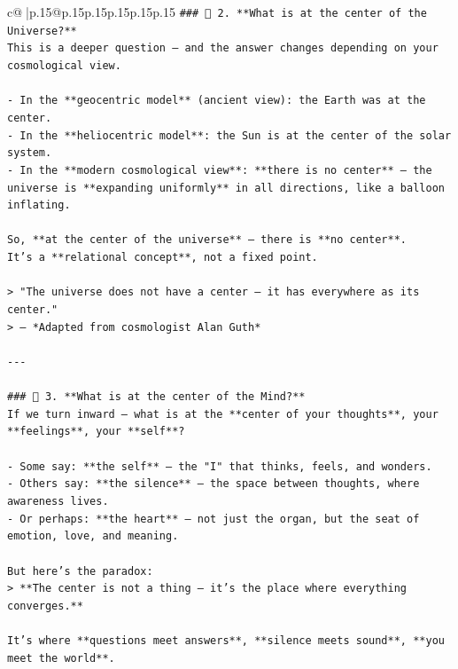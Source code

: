 \documentclass{article}
\begin{document}
{\begin{supertabular}{c@{$\;$}|p{.15\linewidth}@{}p{.15\linewidth}p{.15\linewidth}p{.15\linewidth}p{.15\linewidth}p{.15\linewidth}}
{{{\texttt{\#\#\# 🌌 2. **What is at the center of the Universe?**} \\
\texttt{This is a deeper question — and the answer changes depending on your cosmological view.} \\
\\ 
\texttt{{-} In the **geocentric model** (ancient view): the Earth was at the center.} \\
\texttt{{-} In the **heliocentric model**: the Sun is at the center of the solar system.} \\
\texttt{{-} In the **modern cosmological view**: **there is no center** — the universe is **expanding uniformly** in all directions, like a balloon inflating.} \\
\\ 
\texttt{So, **at the center of the universe** — there is **no center**.  } \\
\texttt{It’s a **relational concept**, not a fixed point.} \\
\\ 
\texttt{> "The universe does not have a center — it has everywhere as its center."  } \\
\texttt{> — *Adapted from cosmologist Alan Guth*} \\
\\ 
\texttt{{-}{-}{-}} \\
\\ 
\texttt{\#\#\# 🧠 3. **What is at the center of the Mind?**} \\
\texttt{If we turn inward — what is at the **center of your thoughts**, your **feelings**, your **self**?} \\
\\ 
\texttt{{-} Some say: **the self** — the "I" that thinks, feels, and wonders.} \\
\texttt{{-} Others say: **the silence** — the space between thoughts, where awareness lives.} \\
\texttt{{-} Or perhaps: **the heart** — not just the organ, but the seat of emotion, love, and meaning.} \\
\\ 
\texttt{But here’s the paradox:  } \\
\texttt{> **The center is not a thing — it’s the place where everything converges.**} \\
\\ 
\texttt{It’s where **questions meet answers**, **silence meets sound**, **you meet the world**.} \\
\\ 
}}}
\end{supertabular}}
\end{document}
